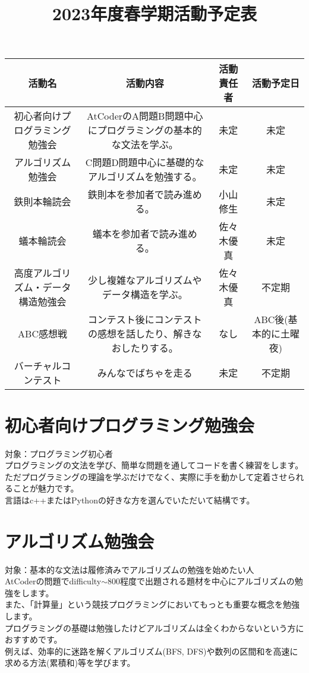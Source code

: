 \documentclass[a4paper, landscape]{jsarticle}
\title{2023年度春学期活動予定表}
\date{}
\begin{document}
\maketitle


\begin{table}[htbp]
  \centering
  \begin{tabular}{c|c|c|c}
    \hline
      活動名 & 活動内容 & 活動責任者 & 活動予定日 \\
    \hline \hline
      初心者向けプログラミング勉強会 & 
      AtCoderのA問題B問題中心にプログラミングの基本的な文法を学ぶ。 &
      未定 &
      未定 \\
    \hline
      アルゴリズム勉強会 &
      C問題D問題中心に基礎的なアルゴリズムを勉強する。 &
      未定 &
      未定 \\
    \hline
     鉄則本輪読会 &
     鉄則本を参加者で読み進める。 &
     小山修生 &
     未定 \\
    \hline
     蟻本輪読会 &
     蟻本を参加者で読み進める。 &
     佐々木優真 &
     未定 \\
    \hline \hline
     高度アルゴリズム・データ構造勉強会 &
     少し複雑なアルゴリズムやデータ構造を学ぶ。 &
     佐々木優真 &
     不定期 \\
     \hline
     ABC感想戦 &
     コンテスト後にコンテストの感想を話したり、解きなおしたりする。 &
     なし &
     ABC後(基本的に土曜夜)\\
     \hline
     バーチャルコンテスト &
     みんなでばちゃを走る &
     未定 &
     不定期 \\
     \hline
  \end{tabular}
\end{table}

\section{初心者向けプログラミング勉強会}
\noindent
対象：プログラミング初心者\\
\indent
プログラミングの文法を学び、簡単な問題を通してコードを書く練習をします。\\
ただプログラミングの理論を学ぶだけでなく、実際に手を動かして定着させられることが魅力です。\\
言語はc++またはPythonの好きな方を選んでいただいて結構です。

\section{アルゴリズム勉強会} \label{sec:algo}
\noindent
対象：基本的な文法は履修済みでアルゴリズムの勉強を始めたい人\\
\indent
AtCoderの問題でdifficulty$\sim$800程度で出題される題材を中心にアルゴリズムの勉強をします。\\
また、「計算量」という競技プログラミングにおいてもっとも重要な概念を勉強します。\\
プログラミングの基礎は勉強したけどアルゴリズムは全くわからないという方におすすめです。\\
例えば、効率的に迷路を解くアルゴリズム(BFS, DFS)や数列の区間和を高速に求める方法(累積和)等を学びます。
\end{document}
